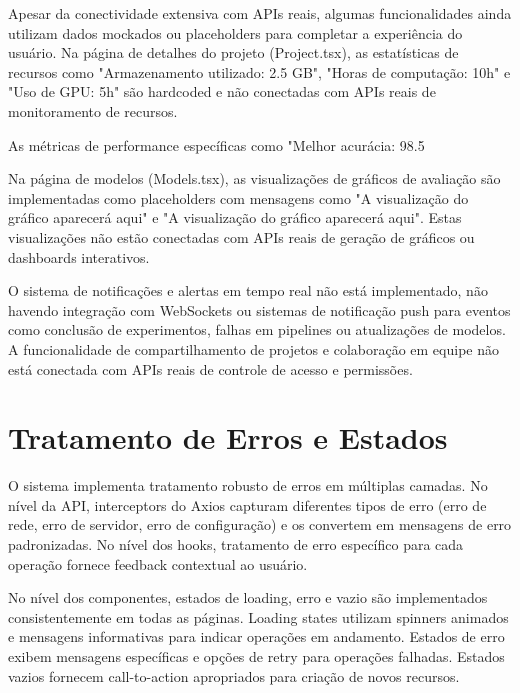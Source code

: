 \documentclass[12pt,a4paper]{article}
\begin{document}
Apesar da conectividade extensiva com APIs reais, algumas funcionalidades ainda utilizam dados mockados ou placeholders para completar a experiência do usuário. Na página de detalhes do projeto (Project.tsx), as estatísticas de recursos como "Armazenamento utilizado: 2.5 GB", "Horas de computação: 10h" e "Uso de GPU: 5h" são hardcoded e não conectadas com APIs reais de monitoramento de recursos.

As métricas de performance específicas como "Melhor acurácia: 98.5%

Na página de modelos (Models.tsx), as visualizações de gráficos de avaliação são implementadas como placeholders com mensagens como "A visualização do gráfico aparecerá aqui" e "A visualização do gráfico aparecerá aqui". Estas visualizações não estão conectadas com APIs reais de geração de gráficos ou dashboards interativos.

O sistema de notificações e alertas em tempo real não está implementado, não havendo integração com WebSockets ou sistemas de notificação push para eventos como conclusão de experimentos, falhas em pipelines ou atualizações de modelos. A funcionalidade de compartilhamento de projetos e colaboração em equipe não está conectada com APIs reais de controle de acesso e permissões.

\section{Tratamento de Erros e Estados}

O sistema implementa tratamento robusto de erros em múltiplas camadas. No nível da API, interceptors do Axios capturam diferentes tipos de erro (erro de rede, erro de servidor, erro de configuração) e os convertem em mensagens de erro padronizadas. No nível dos hooks, tratamento de erro específico para cada operação fornece feedback contextual ao usuário.

No nível dos componentes, estados de loading, erro e vazio são implementados consistentemente em todas as páginas. Loading states utilizam spinners animados e mensagens informativas para indicar operações em andamento. Estados de erro exibem mensagens específicas e opções de retry para operações falhadas. Estados vazios fornecem call-to-action apropriados para criação de novos recursos.
\end{document}
